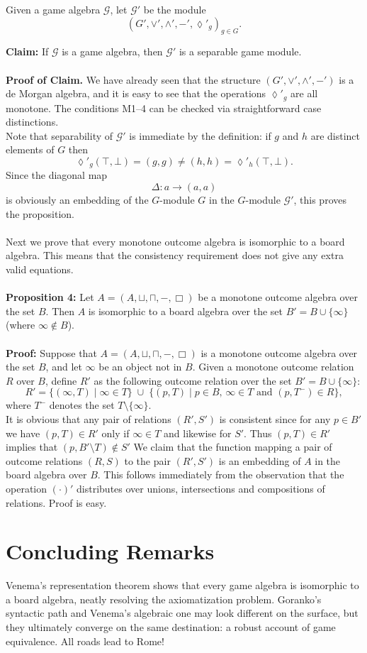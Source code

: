 \documentclass[12pt]{article}
\begin{document}
Given a game algebra $\mathcal{G}$, let $\mathcal{G}'$ be the module 
\[
(G', \vee', \wedge', -', \lozenge'_g)_{g \in G}.
\]

\textbf{Claim:} If $\mathcal{G}$ is a game algebra, then $\mathcal{G}'$ is a separable game module. \\ \\
\textbf{Proof of Claim.} We have already seen that the structure 
$(G', \vee', \wedge', -')$ is a de Morgan algebra, and it is easy to see that the operations 
$\lozenge'_g$ are all monotone. The conditions M1--4 can be checked via straightforward case distinctions. \\
Note that separability of $\mathcal{G}'$ is immediate by the definition: 
if $g$ and $h$ are distinct elements of $G$ then 
\[
\lozenge'_g(\top, \bot) = (g,g) \neq (h,h) = \lozenge'_h(\top, \bot).
\]
Since the diagonal map 
\[
\Delta : a \to (a,a)
\]
is obviously an embedding of the $G$-module $G$ in the $G$-module $\mathcal{G}'$, 
this proves the proposition.\\ \\
Next we prove that every monotone outcome algebra is isomorphic to a board algebra. 
This means that the consistency requirement does not give any extra valid equations. \\ \\
\textbf{Proposition 4:} 
Let $A = (A, \sqcup, \sqcap, -, \Box)$ be a monotone outcome algebra over the set $B$. 
Then $A$ is isomorphic to a board algebra over the set $B' = B \cup \{\infty\}$ (where $\infty \notin B$).\\ \\
\textbf{Proof:} 
Suppose that $A = (A, \sqcup, \sqcap, -, \Box)$ is a monotone outcome algebra over the set $B$, 
and let $\infty$ be an object not in $B$. 
Given a monotone outcome relation $R$ over $B$, define $R'$ as the following outcome relation over the set $B' = B \cup \{\infty\}$:
\[
R' = \{ (\infty, T) \mid \infty \in T \} \;\cup\; \{ (p,T) \mid p \in B, \, \infty \in T \text{ and } (p, T^{-}) \in R \},
\]
where $T^{-}$ denotes the set $T \setminus \{\infty\}$. \\
It is obvious that any pair of relations $(R', S')$ is consistent since for any $p \in B'$ we have 
$(p,T) \in R'$ only if $\infty \in T$ and likewise for $S'$. 
Thus $(p,T) \in R'$ implies that $(p, B' \setminus T) \notin S'$
We claim that the function mapping a pair of outcome relations $(R,S)$ to the pair $(R',S')$ is an embedding of $A$ in the board algebra over $B$. 
This follows immediately from the observation that the operation $(\cdot)'$ distributes over unions, intersections and compositions of relations. Proof is easy. 
\section{Concluding Remarks}
Venema’s representation theorem shows that every game algebra is isomorphic to a board algebra, neatly resolving the axiomatization problem. Goranko’s syntactic path and Venema’s algebraic one may look different on the surface, but they ultimately converge on the same destination: a robust account of game equivalence. All roads lead to Rome!
\end{document}
